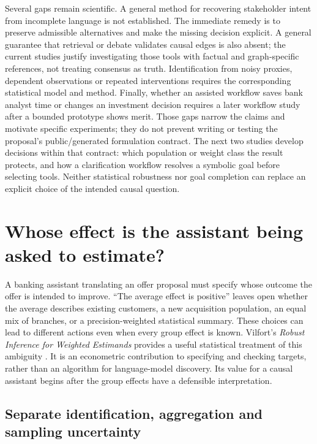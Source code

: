 Several gaps remain scientific. A general method for recovering
stakeholder intent from incomplete language is not established. The
immediate remedy is to preserve admissible alternatives and make the
missing decision explicit. A general guarantee that retrieval or debate
validates causal edges is also absent; the current studies justify
investigating those tools with factual and graph-specific references,
not treating consensus as truth. Identification from noisy proxies,
dependent observations or repeated interventions requires the
corresponding statistical model and method. Finally, whether an assisted
workflow saves bank analyst time or changes an investment decision
requires a later workflow study after a bounded prototype shows merit.
Those gaps narrow the claims and motivate specific experiments; they do
not prevent writing or testing the proposal's public/generated
formulation contract. The next two studies develop decisions within that
contract: which population or weight class the result protects, and how a
clarification workflow resolves a symbolic goal before selecting tools.
Neither statistical robustness nor goal completion can replace an explicit
choice of the intended causal question. \label{exec13:formulation-end}


\section{Whose effect is the assistant being asked to estimate?}
\label{exec22:targets-scope}

A banking assistant translating an offer proposal must specify whose outcome
the offer is intended to improve. ``The average effect is positive'' leaves
open whether the average describes existing customers, a new acquisition
population, an equal mix of branches, or a precision-weighted statistical
summary. These choices can lead to different actions even when every group
effect is known. Vilfort's \emph{Robust Inference for Weighted Estimands}
provides a useful statistical treatment of this ambiguity
\cite{exec22_weighted_vilfort}. It is an econometric contribution to specifying
and checking targets, rather than an algorithm for language-model discovery.
Its value for a causal assistant begins after the group effects have a
defensible interpretation.

\subsection{Separate identification, aggregation and sampling uncertainty}

